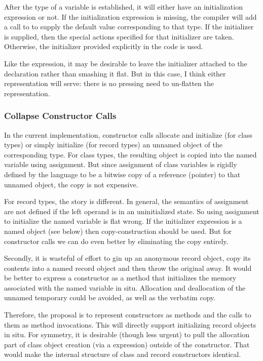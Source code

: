 After the type of a variable is established, it will either have an initialization
expression or not.  If the initialization expression is missing, the compiler will add a
call to  to supply the default value corresponding to that type.  If the
 initializer is supplied, then the special actions specified for
that initializer are taken.  Otherwise, the initializer provided explicitly in the code is
used.

Like the  expression, it may be desirable to leave the initializer attached
to the declaration rather than smashing it flat.  But in this case, I think either
representation will serve: there is no pressing need to un-flatten the representation.

\subsubsection{Collapse Constructor Calls}

In the current implementation, constructor calls allocate and initialize (for class types)
or simply initialize (for record types) an unnamed object of the corresponding type.  
For class types, the resulting object is copied into the named variable using assignment.
But since assignment of class variables is rigidly defined by the language to be a bitwise
copy of a reference (pointer) to that unnamed object, the copy is not expensive.

For record types, the story is different.  In general, the semantics of assignment are not
defined if the left operand is in an uninitialized state.  So using assignment to
initialize the named variable is flat wrong.  If the initializer expression is a named
object (see below) then copy-construction should be used.  But for constructor
calls we can do even better by eliminating the copy entirely.

Secondly, it is wasteful of effort to gin up
an anonymous record object, copy its contents into a named record object and then throw
the original away.  It would be better to express a constructor as a method that
initializes the memory associated with the named variable in situ.  Allocation and
deallocation of the unnamed temporary could be avoided, as well as the verbatim copy.

Therefore, the proposal is to represent constructors as methods and the calls to them as
method invocations.  This will directly support initializing record objects in situ.  For
symmetry, it is desirable (though less urgent) to pull the allocation part of class
object creation (via a  expression) outside of the constructor.  That would make
the internal structure of class and record constructors identical.  

